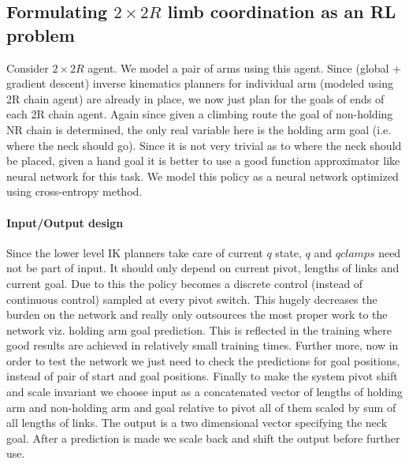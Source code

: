 \documentclass[12pt]{article}
\begin{document}
\subsection{Formulating $2 \times 2R$ limb coordination as an RL problem}
Consider $2 \times 2R$ agent.
We model a pair of arms using this agent.
Since (global + gradient descent) inverse kinematics planners for individual arm (modeled using 2R chain agent) are already in place, we now just plan for the goals of ends of each 2R chain agent.
Again since given a climbing route the goal of non-holding NR chain is determined, the only real variable here is the holding arm goal (i.e. where the neck should go).
Since it is not very trivial as to where the neck should be placed, given a hand goal it is better to use a good function approximator like neural network for this task.
We model this policy as a neural network optimized using cross-entropy method.

\paragraph{Input/Output design}
Since the lower level IK planners take care of current $q$ state, $q$ and $qclamps$ need not be part of input.
It should only depend on current pivot, lengths of links and current goal.
Due to this the policy becomes a discrete control (instead of continuous control) sampled at every pivot switch.
This hugely decreases the burden on the network and really only outsources the most proper work to the network viz. holding arm goal prediction.
This is reflected in the training where good results are achieved in relatively small training times.
Further more, now in order to test the network we just need to check the predictions for goal positions, instead of pair of start and goal positions.
Finally to make the system pivot shift and scale invariant we choose input as a concatenated vector of lengths of holding arm and non-holding arm and goal relative to pivot all of them scaled by sum of all lengths of links.
The output is a two dimensional vector specifying the neck goal.
After a prediction is made we scale back and shift the output before further use.
\end{document}
